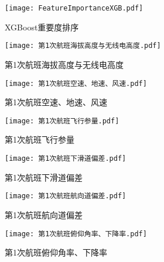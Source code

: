 \documentclass{MathorCupModeling}
\begin{document}
	\begin{figure}[H]
		\centering
		\texttt{[image: FeatureImportanceXGB.pdf]}
		\caption{XGBoost重要度排序}
		\label{fig:XGBoost排序}
	\end{figure}

	\begin{figure}[H]
		\centering
		\begin{minipage}{0.48\linewidth}
			\centering
			\texttt{[image: 第1次航班海拔高度与无线电高度.pdf]}
			\caption{第1次航班海拔高度与无线电高度}
			\label{fig:第1次航班海拔高度与无线电高度}
		\end{minipage}
		\begin{minipage}{0.48\linewidth}
			\centering
			\texttt{[image: 第1次航班空速、地速、风速.pdf]}
			\caption{第1次航班空速、地速、风速}
			\label{fig:第1次航班空速、地速、风速}
		\end{minipage}
	\end{figure}
	\begin{figure}[H]
		\centering
		\begin{minipage}{0.48\linewidth}
			\centering
			\texttt{[image: 第1次航班飞行参量.pdf]}
			\caption{第1次航班飞行参量}
			\label{fig:第1次航班飞行参量}
		\end{minipage}
		\begin{minipage}{0.48\linewidth}
			\centering
			\texttt{[image: 第1次航班下滑道偏差.pdf]}
			\caption{第1次航班下滑道偏差}
			\label{fig:第1次航班下滑道偏差}
		\end{minipage}
	\end{figure}
	\begin{figure}[H]
		\centering
		\begin{minipage}{0.48\linewidth}
			\centering
			\texttt{[image: 第1次航班航向道偏差.pdf]}
			\caption{第1次航班航向道偏差}
			\label{fig:第1次航班航向道偏差}
		\end{minipage}
		\begin{minipage}{0.48\linewidth}
			\centering
			\texttt{[image: 第1次航班俯仰角率、下降率.pdf]}
			\caption{第1次航班俯仰角率、下降率}
			\label{fig:第1次航班俯仰角率、下降率}
		\end{minipage}
	\end{figure}
	
\end{document}

